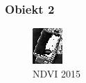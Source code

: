 \documentclass[a4paper,12pt]{article}  %
\begin{document}
\subsubsection{Obiekt 2}

\begin{figure}[H]
    \centering
    \begin{minipage}{0.24\textwidth}
        \centering
        \includegraphics[width=\linewidth]{spektralne/ndvi_budynek0_2015.png}
        \caption*{NDVI 2015}
    \end{minipage}
    \begin{minipage}{0.24\textwidth}
        \centering

\end{minipage}
\end{figure}
\end{document}
